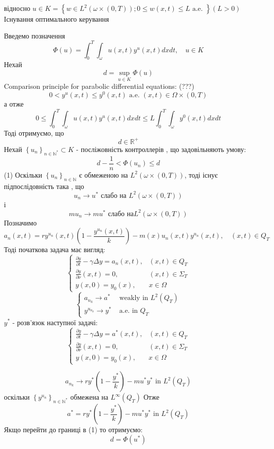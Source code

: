 \documentclass[a4paper,12pt]{extreport}
\begin{document}
відносно $u \in K=\left\{w \in L^2(\omega \times(0, T)) ; 0 \leq w(x, t) \leq L \text { a.e. }\right\}(L>0)$
Існування оптимального керування

Введемо позначення
$$
\Phi(u)=\int_0^T \int_\omega u(x, t) y^u(x, t) d x d t, \quad u \in K
$$
Нехай
$$
d=\sup _{u \in K} \Phi(u)
$$
Comparison principle for parabolic differential equations: (???)
$$
0<y^u(x, t) \leq y^0(x, t) \text { a.e. }(x, t) \in \Omega \times(0, T)
$$
  а отже
$$
0 \leq \int_0^T \int_\omega u(x, t) y^u(x, t) d x d t \leq L \int_0^T \int_\omega y^0(x, t) d x d t
$$
Тоді отримуємо, що 
$$
d \in \mathbb{R}^{+}
$$
Нехай $\left\{u_n\right\}_{n \in \mathbb{N}^*} \subset K$ - посліжовність контроллерів , що задовільняють умову:
$$
d-\frac{1}{n}<\Phi\left(u_n\right) \leq d
$$ (1)
Оскільки $\left\{u_n\right\}_{n \in \mathbb{N}}$ є обмеженою на $L^2(\omega \times(0, T))$, тоді існує підпослідовність така , що 
$$
u_n \longrightarrow u^* \text { слабо на } L^2(\omega \times(0, T))
$$
і 
$$
m u_n \longrightarrow m u^* \text { слабо на} L^2(\omega \times(0, T))
$$
Позначимо 
$$
a_n(x, t)=r y^{u_n}(x, t)\left(1-\frac{y^{u_n}(x, t)}{k}\right)-m(x) u_n(x, t) y^{u_n}(x, t), \quad(x, t) \in Q_T
$$
Тоді початкова задача має вигляд:
$$
\begin{cases}\frac{\partial y}{\partial t}-\gamma \Delta y=a_n(x, t), & (x, t) \in Q_T \\ \frac{\partial y}{\partial \nu}(x, t)=0, & (x, t) \in \Sigma_T \\ y(x, 0)=y_0(x), & x \in \Omega\end{cases}
$$
$$
\begin{cases}a_{n_k} \longrightarrow a^* & \text { weakly in } L^2\left(Q_T\right) \\ y^{u_{n_k}} \longrightarrow y^* & \text { a.e. in } Q_T\end{cases}
$$
$y^*$ - розв'язок наступної задачі:
$$
\begin{cases}\frac{\partial y}{\partial t}-\gamma \Delta y=a^*(x, t), & (x, t) \in Q_T \\ \frac{\partial y}{\partial \nu}(x, t)=0, & (x, t) \in \Sigma_T \\ y(x, 0)=y_0(x), & x \in \Omega\end{cases}
$$

$$
a_{n_k} \longrightarrow r y^*\left(1-\frac{y^*}{k}\right)-m u^* y^* \text { in } L^2\left(Q_T\right)
$$
оскільки $\left\{y^{u_n}\right\}_{n \in \mathbb{N}^*} \text { обмежена на } L^{\infty}\left(Q_T\right)$
Отже $$
a^*=r y^*\left(1-\frac{y^*}{k}\right)-m u^* y^* \text { in } L^2\left(Q_T\right)
$$
Якщо перейти до границі в (1) то отримуємо:
$$
d=\Phi\left(u^*\right)
$$
\end{document}
